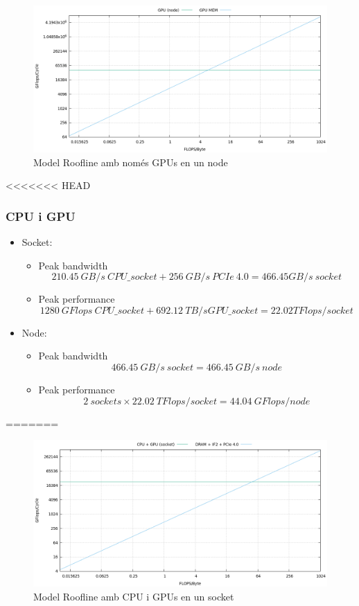 \begin{figure}[H]
    \centering
    \includegraphics[width=\textwidth]{img/roofline_gpun_memgpu}
    \caption{Model Roofline amb només GPUs en un node}
    \label{fig:summary}
\end{figure}

<<<<<<< HEAD
\subsubsection{CPU i GPU}
\begin{itemize}
    \item Socket:
        \begin{itemize}
            \item Peak bandwidth
                \[210.45\ GB/s\ CPU\_socket + 256\ GB/s\ PCIe\ 4.0 = 466.45 GB/s\ socket\]
            \item Peak performance
                \[ 1280\ GFlops\ CPU\_socket + 692.12\ TB/s GPU\_socket = 22.02 TFlops/socket\]
        \end{itemize}
    \item Node:
        \begin{itemize}
            \item Peak bandwidth
                \[466.45\ GB/s\ socket = 466.45\ GB/s\ node\]
            \item Peak performance
\[2\ sockets \times 22.02\ TFlops/socket = 44.04\ GFlops/node\]
        \end{itemize}
\end{itemize}

=======
\begin{figure}[H]
    \centering
    \includegraphics[width=\textwidth]{img/roofline_cpu_gpus}
    \caption{Model Roofline amb CPU i GPUs en un socket}
    \label{fig:summary}
\end{figure}


